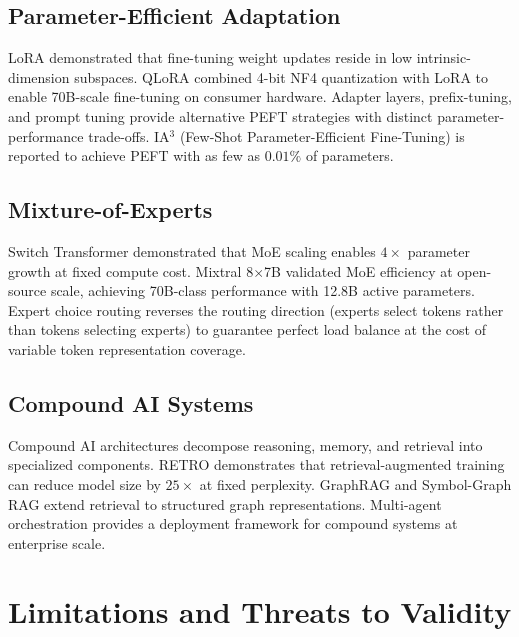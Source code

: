 \documentclass[10pt,twocolumn,letterpaper]{article}
\begin{document}
\subsection{Parameter-Efficient Adaptation}


LoRA \cite{crossref_10_48550_arxiv_2106_09685} demonstrated that fine-tuning weight updates reside in low intrinsic-dimension subspaces. QLoRA \cite{crossref_10_48550_arxiv_2305_14314} combined 4-bit NF4 quantization with LoRA to enable 70B-scale fine-tuning on consumer hardware. Adapter layers, prefix-tuning, and prompt tuning provide alternative PEFT strategies with distinct parameter-performance trade-offs. IA$^3$ (Few-Shot Parameter-Efficient Fine-Tuning) is reported to achieve PEFT with as few as $0.01\%$ of parameters.


\subsection{Mixture-of-Experts}


Switch Transformer demonstrated that MoE scaling enables $4\times$ parameter growth at fixed compute cost. Mixtral 8$\times$7B validated MoE efficiency at open-source scale, achieving 70B-class performance with 12.8B active parameters. Expert choice routing reverses the routing direction (experts select tokens rather than tokens selecting experts) to guarantee perfect load balance at the cost of variable token representation coverage.


\subsection{Compound AI Systems}


Compound AI architectures \cite{arxiv_2406_00584} decompose reasoning, memory, and retrieval into specialized components. RETRO \cite{arxiv_2310_09270} demonstrates that retrieval-augmented training can reduce model size by $25\times$ at fixed perplexity. GraphRAG \cite{arxiv_2501_14050} and Symbol-Graph RAG extend retrieval to structured graph representations. Multi-agent orchestration \cite{arxiv_2404_01131,crossref_10_1109_access_2026_3656309} provides a deployment framework for compound systems at enterprise scale.




\section{Limitations and Threats to Validity}
\end{document}
